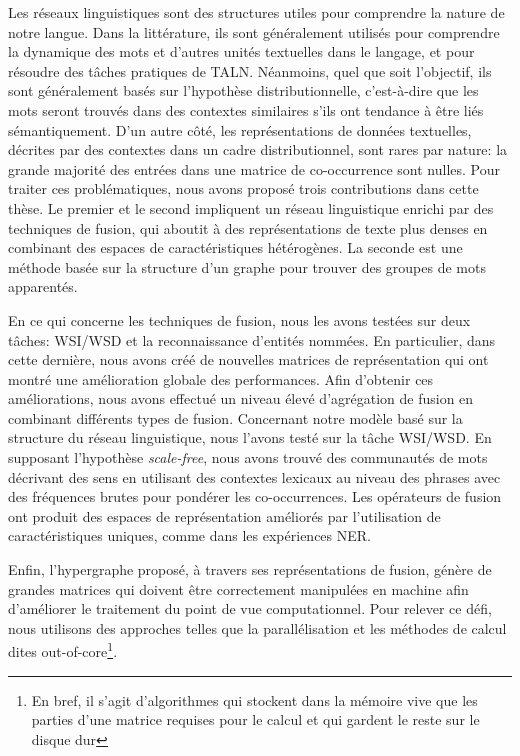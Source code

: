 \documentclass[a4paper,11pt,twoside]{article}
\begin{document}
Les réseaux linguistiques sont des structures utiles pour comprendre la nature de notre langue. Dans la littérature, ils sont généralement utilisés pour comprendre la dynamique des mots et d'autres unités textuelles dans le langage, et pour résoudre des tâches pratiques de TALN. Néanmoins, quel que soit l'objectif, ils sont généralement basés sur l'hypothèse distributionnelle, c'est-à-dire que les mots seront trouvés dans des contextes similaires s'ils ont tendance à être liés sémantiquement. D'un autre côté, les représentations de données textuelles, décrites par des contextes dans un cadre distributionnel, sont rares par nature: la grande majorité des entrées dans une matrice de co-occurrence sont nulles. Pour traiter ces problématiques, nous avons proposé trois contributions dans cette thèse. Le premier et le second impliquent un réseau linguistique enrichi par des techniques de fusion, qui aboutit à des représentations de texte plus denses en combinant des espaces de caractéristiques hétérogènes. La seconde est une méthode basée sur la structure d'un graphe pour trouver des groupes de mots apparentés.

En ce qui concerne les techniques de fusion, nous les avons testées sur deux tâches: WSI/WSD et la reconnaissance d'entités nommées. En particulier, dans cette dernière, nous avons créé de nouvelles matrices de représentation qui ont montré une amélioration globale des performances. Afin d'obtenir ces améliorations,  nous avons effectué un niveau élevé d'agrégation de fusion en combinant différents types de fusion. Concernant notre modèle basé sur la structure du réseau linguistique, nous l'avons testé sur la tâche WSI/WSD. En supposant l'hypothèse \textit{scale-free}, nous avons trouvé des communautés de mots décrivant des sens en utilisant des contextes lexicaux au niveau des phrases avec des fréquences brutes pour pondérer les co-occurrences. Les opérateurs de fusion ont produit des espaces de représentation améliorés par l'utilisation de caractéristiques uniques, comme dans les expériences NER.

Enfin, l'hypergraphe proposé, à travers ses représentations de fusion, génère de grandes matrices qui doivent être correctement manipulées en machine afin d'améliorer le traitement du point de vue computationnel. Pour relever ce défi, nous utilisons des approches telles que la parallélisation et les méthodes de calcul dites out-of-core\footnote{En bref, il s'agit d'algorithmes qui stockent dans la mémoire vive que les parties d'une matrice requises pour le calcul et qui gardent le reste sur le disque dur}.
\end{document}

